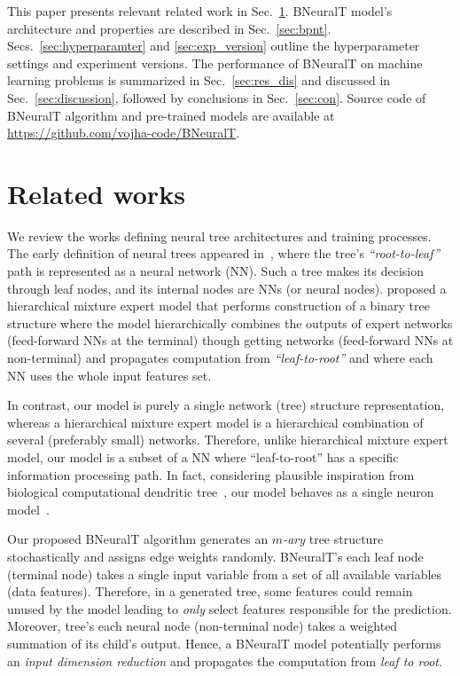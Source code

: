 \documentclass[11pt,a4paper]{article}
\begin{document}
    
    This paper presents relevant related work in Sec.~\ref{sec:related_work}. BNeuralT model's architecture and properties are described in Sec.~\ref{sec:bpnt}. Secs.~\ref{sec:hyperparamter} and \ref{sec:exp_version} outline the hyperparameter settings and experiment versions. The performance of BNeuralT on machine learning problems is summarized in Sec.~\ref{sec:res_dis} and discussed in Sec.~\ref{sec:discussion}, followed by conclusions in Sec.~\ref{sec:con}. Source code of BNeuralT algorithm and pre-trained models are available at \url{https://github.com/vojha-code/BNeuralT}.
    
    
    
    \section{Related works}
    \label{sec:related_work}
We review the works defining neural tree architectures and training processes. The early definition of neural trees appeared in~\citep{sakar1993growing,sirat1990neural}, where the tree's \textit{``root-to-leaf''} path is represented as a neural network (NN). Such a tree makes its decision through leaf nodes, and its internal nodes are NNs (or neural nodes). \cite{jordan1994hierarchical} proposed a hierarchical mixture expert model that performs construction of a binary tree structure where the model hierarchically combines the outputs of expert networks (feed-forward NNs at the terminal) though getting networks (feed-forward NNs at non-terminal) and propagates computation from \textit{``leaf-to-root''} and where each NN uses the whole input features set. 
    
    In contrast, our model is purely a single network (tree) structure representation, whereas a hierarchical mixture expert model is a hierarchical combination of several (preferably small) networks. Therefore, unlike hierarchical mixture expert model, our model is a subset of a NN where ``leaf-to-root'' has a specific information processing path. 
    In fact, considering plausible inspiration from biological computational dendritic tree~\citep{travis2005regional,mel2016toward,poirazi2003pyramidal}, our model behaves as a single neuron model~\citep{jones2021might}.
    
    Our proposed BNeuralT algorithm generates an \textit{$m$-ary} tree structure stochastically and assigns edge weights randomly. BNeuralT's each leaf node (terminal node) takes a single input variable from a set of all available variables (data features). Therefore, in a generated tree, some features could remain unused by the model leading to \textit{only} select features responsible for the prediction. Moreover, tree's each neural node (non-terminal node) takes a weighted summation of its child's output. Hence, a BNeuralT model potentially performs an \textit{input dimension reduction} and propagates the computation from \textit{leaf to root}. 
\end{document}
